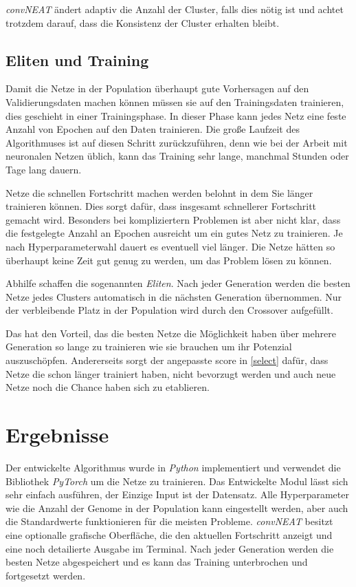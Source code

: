 \documentclass[]{scrartcl}
\begin{document}
				\textit{convNEAT} ändert adaptiv die Anzahl der Cluster, falls dies nötig ist und achtet trotzdem darauf, dass die Konsistenz der Cluster erhalten bleibt.



		\subsection{Eliten und Training}
			
			Damit die Netze in der Population überhaupt gute Vorhersagen auf den Validierungsdaten machen können müssen sie auf den Trainingsdaten trainieren, dies geschieht in einer Trainingsphase.
			In dieser Phase kann jedes Netz eine feste Anzahl von Epochen auf den Daten trainieren. Die große Laufzeit des Algorithmuses ist auf diesen Schritt zurückzuführen, denn 
			wie bei der Arbeit mit neuronalen Netzen üblich, kann das Training sehr lange, manchmal Stunden oder Tage lang dauern.

			Netze die schnellen Fortschritt machen werden belohnt in dem Sie länger trainieren können. Dies sorgt dafür, dass insgesamt schnellerer Fortschritt gemacht wird.
			Besonders bei kompliziertern Problemen ist aber nicht klar, dass die festgelegte Anzahl an Epochen ausreicht um ein gutes Netz zu trainieren.
			Je nach Hyperparameterwahl dauert es eventuell viel länger. Die Netze hätten so überhaupt keine Zeit gut genug zu werden, um das Problem lösen zu können.

			Abhilfe schaffen die sogenannten \textit{Eliten}. Nach jeder Generation werden die besten Netze jedes Clusters automatisch in die nächsten Generation übernommen.
			Nur der verbleibende Platz in der Population wird durch den Crossover aufgefüllt.

			Das hat den Vorteil, das die besten Netze die Möglichkeit haben über mehrere Generation so lange zu trainieren wie sie brauchen um ihr Potenzial auszuschöpfen.
			Andererseits sorgt der angepasste score in \ref{select} dafür, dass Netze die schon länger trainiert haben, nicht bevorzugt werden und auch neue Netze noch die Chance haben
			sich zu etablieren.
	
	\section{Ergebnisse}\label{ergeb}
		
		Der entwickelte Algorithmus wurde in \textit{Python} implementiert und verwendet die Bibliothek \textit{PyTorch} um die Netze zu trainieren.
		Das Entwickelte Modul lässt sich sehr einfach ausführen, der Einzige Input ist der Datensatz. 
		Alle Hyperparameter wie die Anzahl der Genome in der Population kann eingestellt werden, aber auch die Standardwerte funktionieren für die meisten Probleme.
		\textit{convNEAT} besitzt eine optionalle grafische Oberfläche, die den aktuellen Fortschritt anzeigt und eine noch detailierte Ausgabe im Terminal.
		Nach jeder Generation werden die besten Netze abgespeichert und es kann das Training unterbrochen und fortgesetzt werden.
\end{document}
